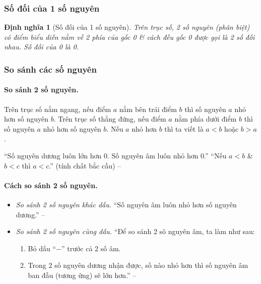 \documentclass{article}
\numberwithin{equation}{section}
\newtheorem{definition}{Định nghĩa}[section]
\begin{document}
\subsubsection{Số đối của 1 số nguyên}

\begin{definition}[Số đối của 1 số nguyên]
	Trên trục số, 2 số nguyên (phân biệt) có điểm biểu diễn nằm về 2 phía của gốc 0 \& cách đều gốc 0 được gọi là \emph{2 số đối nhau}. Số đối của 0 là 0.
\end{definition}

\subsubsection{So sánh các số nguyên}

\paragraph{So sánh 2 số nguyên.}
\noindent\begin{tcolorbox}
	Trên trục số nằm ngang, nếu điểm $a$ nằm bên trái điểm $b$ thì số nguyên $a$ nhỏ hơn số nguyên $b$. Trên trục số thẳng đứng, nếu điểm $a$ nằm phía dưới điểm $b$ thì số nguyên $a$ nhỏ hơn số nguyên $b$. Nếu $a$ nhỏ hơn $b$ thì ta viết là $a < b$ hoặc $b > a$.
\end{tcolorbox}
``Số nguyên dương luôn lớn hơn 0. Số nguyên âm luôn nhỏ hơn 0.'' ``Nếu $a < b$ \& $b < c$ thì $a < c$.'' (tính chất bắc cầu) -- \cite[p. 67]{Thai_Anh_Dat_Ha_Loan_Nam_Quang_Toan_6_tap_1}

\paragraph{Cách so sánh 2 số nguyên.}
\begin{itemize}
	\item \textit{So sánh 2 số nguyên khác dấu.} ``Số nguyên âm luôn nhỏ hơn số nguyên dương.'' -- \cite[p. 68]{Thai_Anh_Dat_Ha_Loan_Nam_Quang_Toan_6_tap_1}
	\item \textit{So sánh 2 số nguyên cùng dấu.} ``Để so sánh 2 sô nguyên âm, ta làm như sau:
	\begin{enumerate}
		\item Bỏ dấu ``$-$'' trước cả 2 số âm.
		\item Trong 2 số nguyên dương nhận được, số nào nhỏ hơn thì số nguyên âm ban đầu (tương ứng) sẽ lớn hơn.'' -- \cite[p. 69]{Thai_Anh_Dat_Ha_Loan_Nam_Quang_Toan_6_tap_1}
	\end{enumerate}
\end{itemize}
\end{document}
